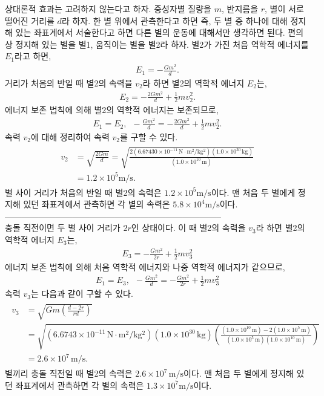 \documentclass[floatfix,nofootinbib,superscriptaddress,fleqn]{revtex4-2}
\begin{document}
상대론적 효과는 고려하지 않는다고 하자. 중성자별 질량을 $m$, 반지름을 $r$, 
별이 서로 떨어진 거리를 $d$라 하자. 한 별 위에서 관측한다고 하면 즉,
두 별 중 하나에 대해 정지해 있는 좌표계에서 서술한다고 하면 다른 별의 운동에 대해서만 생각하면 된다. 
편의상 정지해 있는 별을 별1, 움직이는 별을 별2라 하자.
별2가 가진 처음 역학적 에너지를 $E_1$라고 하면,
\begin{align}
    E_1 = -\frac{Gm^2}{d}.
\end{align}
거리가 처음의 반일 때 별2의 속력을 $v_2$라 하면 별2의 역학적 에너지 $E_2$는,
\begin{align}
    E_2 = -\frac{2Gm^2}{d}+ \frac{1}{2}mv_2^2.
\end{align}
에너지 보존 법칙에 의해 별2의 역학적 에너지는 보존되므로,
\begin{align}
    E_1=E_2,\,\,\,-\frac{Gm^2}{d}=-\frac{2Gm^2}{d}+ \frac{1}{2}mv_2^2.
\end{align}
속력 $v_2$에 대해 정리하여 속력 $v_2$를 구할 수 있다.
\begin{align}
    \begin{split}
        v_2 &= \sqrt{\frac{2Gm}{d}} 
        =\sqrt{\frac{2(6.67430\times 10^{-11}\,\mathrm{N\cdot m^2/kg^2})
        (1.0\times 10^{30}\,\mathrm{kg})}{(1.0\times 10^{10}\,\mathrm{m})}} \\
        &=1.2\times 10^5\mathrm{m/s}.
    \end{split}
\end{align}
별 사이 거리가 처음의 반일 때 별2의 속력은 $1.2\times 10^5\mathrm{m/s}$이다. 
맨 처음 두 별에게 정지해 있던 좌표계에서 관측하면 각 별의 속력은 $5.8\times 10^4\mathrm{m/s}$이다.    \\
-----------------------------------------------------------------------------   \\
충돌 직전이면 두 별 사이 거리가 $2r$인 상태이다. 이 때 별2의 속력을 $v_3$라 하면 
별2의 역학적 에너지 $E_3$는,
\begin{align}
    E_3 =-\frac{Gm^2}{2r} + \frac{1}{2}mv_3^2
\end{align}
에너지 보존 법칙에 의해 처음 역학적 에너지와 나중 역학적 에너지가 같으므로,
\begin{align}
    E_1 = E_3,\,\,\, -\frac{Gm^2}{d}=-\frac{Gm^2}{2r} + \frac{1}{2}mv_3^2
\end{align}
속력 $v_3$는 다음과 같이 구할 수 있다.
\begin{align}
    \begin{split}
        v_3&=\sqrt{Gm\left(\frac{d-2r}{rd}\right)}  \\ 
        &=\sqrt{(6.6743\times 10^{-11}\,\mathrm{N\cdot m^2/kg^2})
        (1.0\times 10^{30}\,\mathrm{kg})
        \left(\frac{(1.0\times 10^{10}\,\mathrm{m})-2(1.0\times 10^{5}\,\mathrm{m})}
        {(1.0\times 10^{5}\,\mathrm{m})(1.0\times 10^{10}\,\mathrm{m})}\right)} \\
        &=2.6\times 10^7\,\mathrm{m/s}.
    \end{split}
\end{align}
별끼리 충돌 직전일 때 별2의 속력은 $2.6\times 10^7\,\mathrm{m/s}$이다. 
맨 처음 두 별에게 정지해 있던 좌표계에서 관측하면 각 별의 속력은 $1.3\times 10^7\mathrm{m/s}$이다.
\vspace{1.cm}
\end{document}

